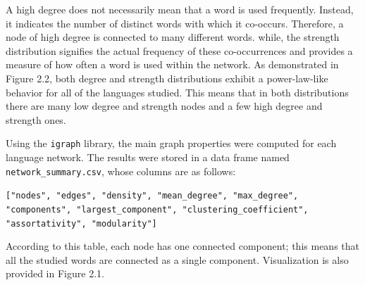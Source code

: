 \noindent
A high degree does not necessarily mean that a word is used frequently. Instead, it indicates the number of distinct words with which it co-occurs. Therefore, a node of high degree is connected to many different words. while, the strength distribution signifies the actual frequency of these co-occurrences and provides a measure of how often a word is used within the network. As demonstrated in Figure 2.2, both degree and strength distributions exhibit a power-law-like behavior for all of the languages studied. This means that in both distributions there are many low degree and strength nodes and a few high degree and strength ones.

\noindent
Using the \texttt{igraph} library, the main graph properties were computed for each language network. The results were stored in a data frame named \texttt{network\_summary.csv}, whose columns are as follows:

\begin{flushleft}
\texttt{["nodes", "edges", "density", "mean\_degree", "max\_degree", "components", "largest\_component", "clustering\_coefficient", "assortativity", "modularity"]}
\end{flushleft}

\noindent
According to this table, each node has one connected component; this means that all the studied words are connected as a single component. Visualization is also provided in Figure 2.1.


